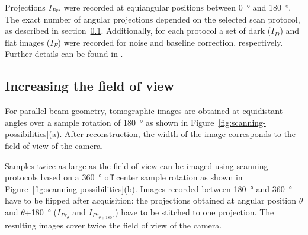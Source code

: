 \documentclass[preprint,s]{iucr}
\begin{document}
Projections $I_{Pr}$, were recorded at equiangular positions between \SI{0}{\degree} and \SI{180}{\degree}. The exact number of angular projections depended on the selected scan protocol, as described in section~\ref{subsec:increasing the field of view}. Additionally, for each protocol a set of dark ($I_{D}$) and flat images ($I_{F}$) were recorded for noise and baseline correction, respectively. Further details can be found in .

\subsection{Increasing the field of view}\label{subsec:increasing the field of view}
For parallel beam geometry, tomographic images are obtained at equidistant angles over a sample rotation of \SI{180}{\degree} as shown in Figure~\ref{fig:scanning-possibilities}(a). After reconstruction, the width of the image corresponds to the field of view of the camera.

Samples twice as large as the field of view can be imaged using scanning protocols based on a \SI{360}{\degree} off center sample rotation as shown in Figure~\ref{fig:scanning-possibilities}(b). Images recorded between \SI{180}{\degree} and \SI{360}{\degree} have to be flipped after acquisition: the projections obtained at angular position $\theta$ and $\theta$+\SI{180}{\degree} ($I_{Pr_{\theta}}$ and $I_{Pr_{\theta+\SI{180}{\degree}}}$) have to be stitched to one projection. The resulting images cover twice the field of view of the camera.
\end{document}
